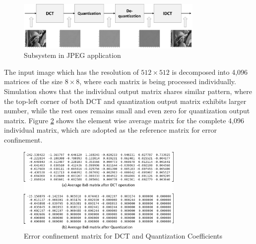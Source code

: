 \begin{figure}
\centering
\includegraphics[width=90mm]{./eps/qos_jpeg}
\caption{Subsystem in JPEG application}
\vspace{-3mm}
\label{fig:qos_jpeg}
\end{figure}

The input image which has the resolution of $512 \times 512$ is decomposed into 4,096 matrices of the size $8 \times 8$, where each matrix is being processed individually. Simulation shows that the individual output matrix shares similar pattern, where the top-left corner of both DCT and quantization output matrix exhibits larger number, while the rest ones remains small and even zero for quantization output matrix. Figure \ref{fig:qos_matrix} shows the element wise average matrix for the complete 4,096 individual matrix, which are adopted as the reference matrix for error confinement.

\begin{figure}
\centering
\includegraphics[width=80mm]{./eps/qos_matrix}
\caption{Error confinement matrix for DCT and Quantization Coefficients}
\vspace{-3mm}
\label{fig:qos_matrix}
\end{figure}

